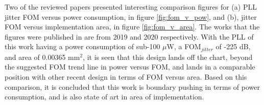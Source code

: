 Two of the reviewed papers presented interesting comparison figures for (a) PLL jitter FOM versus power consumption, in figure \ref{fig:fom_v_pow}, and (b), jitter FOM versus implementation area, in figure \ref{fig:fom_v_area}. The works that the figures were published in are from 2019 and 2020 respectively. With the PLL of this work having a power consumption of sub-100 $\mu$W, a FOM$_{jitter}$ of -225 dB, and area of 0.00365 mm$^2$, it is seen that this design lands off the chart, beyond the suggested FOM trend line in power versus FOM, and lands in a comparable position with other recent design in terms of FOM versus area. Based on this comparison, it is concluded that this work is boundary pushing in terms of power consumption, and is also state of art in area of implementation.
\FloatBarrier\pagebreak


